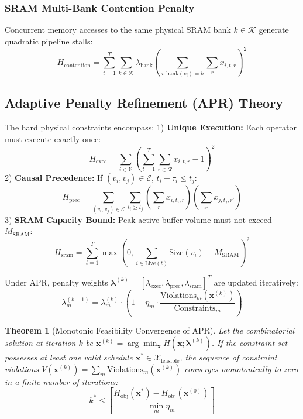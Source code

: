 \documentclass[journal]{IEEEtran}
\newtheorem{theorem}{Theorem}
\theoremstyle{definition}
\begin{document}
\subsubsection{SRAM Multi-Bank Contention Penalty}
Concurrent memory accesses to the same physical SRAM bank $k \in \mathcal{K}$ generate quadratic pipeline stalls:
\begin{equation}
H_{\text{contention}} = \sum_{t=1}^T \sum_{k \in \mathcal{K}} \lambda_{\text{bank}} \left( \sum_{i: \text{bank}(v_i)=k} \sum_r x_{i,t,r} \right)^2
\end{equation}

\subsection{Adaptive Penalty Refinement (APR) Theory}
The hard physical constraints encompass:
1) \textbf{Unique Execution:} Each operator must execute exactly once:
\begin{equation}
H_{\text{exec}} = \sum_{i \in \mathcal{V}} \left( \sum_{t=1}^T \sum_{r \in \mathcal{R}} x_{i,t,r} - 1 \right)^2
\end{equation}
2) \textbf{Causal Precedence:} If $(v_i, v_j) \in \mathcal{E}$, $t_i + \tau_i \le t_j$:
\begin{equation}
H_{\text{prec}} = \sum_{(v_i, v_j) \in \mathcal{E}} \sum_{t_i \ge t_j} \left(\sum_r x_{i,t_i,r}\right) \left(\sum_{r'} x_{j,t_j,r'}\right)
\end{equation}
3) \textbf{SRAM Capacity Bound:} Peak active buffer volume must not exceed $M_{\text{SRAM}}$:
\begin{equation}
H_{\text{sram}} = \sum_{t=1}^T \max\left(0, \sum_{i \in \text{Live}(t)} \text{Size}(v_i) - M_{\text{SRAM}}\right)^2
\end{equation}

Under APR, penalty weights $\boldsymbol{\lambda}^{(k)} = [\lambda_{\text{exec}}, \lambda_{\text{prec}}, \lambda_{\text{sram}}]^T$ are updated iteratively:
\begin{equation}
\lambda_m^{(k+1)} = \lambda_m^{(k)} \cdot \left( 1 + \eta_m \cdot \frac{\text{Violations}_m(\mathbf{x}^{(k)})}{\text{Constraints}_m} \right)
\label{eq:apr_law}
\end{equation}

\begin{theorem}[Monotonic Feasibility Convergence of APR]
Let the combinatorial solution at iteration $k$ be $\mathbf{x}^{(k)} = \arg\min_{\mathbf{x}} H(\mathbf{x}; \boldsymbol{\lambda}^{(k)})$. If the constraint set possesses at least one valid schedule $\mathbf{x}^* \in \mathcal{X}_{\text{feasible}}$, the sequence of constraint violations $V(\mathbf{x}^{(k)}) = \sum_m \text{Violations}_m(\mathbf{x}^{(k)})$ converges monotonically to zero in a finite number of iterations:
\begin{equation}
k^* \le \left\lceil \frac{H_{\text{obj}}(\mathbf{x}^*) - H_{\text{obj}}(\mathbf{x}^{(0)})}{\min_m \eta_m} \right\rceil
\end{equation}
\end{theorem}
\end{document}
